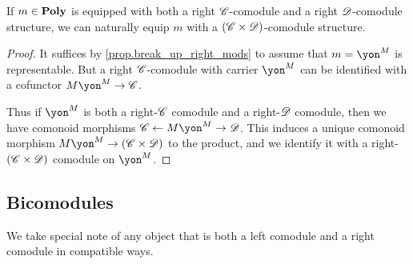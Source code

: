 \documentclass[Book-Poly]{subfiles}
\begin{document}
\begin{proposition}
If $m\in\mathbf{Poly}$ is equipped with both a right $\mathscr{C}$-comodule and a right $\mathscr{D}$-comodule structure, we can naturally equip $m$ with a $(\mathscr{C}\times\mathscr{D})$-comodule structure.
\end{proposition}
\begin{proof}
It suffices by \cref{prop.break_up_right_mods} to assume that $m=\yon^M$ is representable. But a right $\mathscr{C}$-comodule with carrier $\yon^M$ can be identified with a cofunctor $M\yon^M\to\com{C}$.

Thus if $\yon^M$ is both a right-$\mathscr{C}$ comodule and a right-$\mathscr{D}$ comodule, then we have comonoid morphisms $\com{C}\from M\yon^M\to\com{D}$. This induces a unique comonoid morphism $M\yon^M\to(\com{C}\times\com{D})$ to the product, and we identify it with a right-$(\mathscr{C}\times\mathscr{D})$ comodule on $\yon^M$.
\end{proof}

\subsection{Bicomodules}

We take special note of any object that is both a left comodule and a right comodule in compatible ways.
\end{document}
